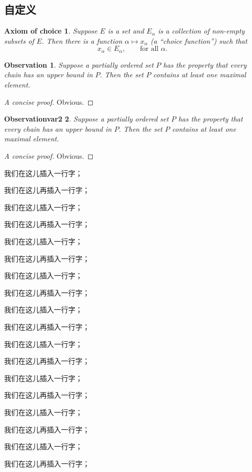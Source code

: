 \subsection{自定义}

\newtheorem*{axiomofchoice}{Axiom of choice}
\begin{axiomofchoice}
  Suppose $E$ is a set and ${E_\alpha}$ is a collection of
  non-empty subsets of $E$. Then there is a function $\alpha
    \mapsto x_\alpha$ (a ``choice function'') such that
  \begin{equation}
    x_\alpha \in E_\alpha,\qquad \text{for all }\alpha.
  \end{equation}
\end{axiomofchoice}

\newtheorem{observation}{Observation}[chapter]
\begin{observation}
  Suppose a partially ordered set $P$ has the property
  that every chain has an upper bound in $P$. Then the
  set $P$ contains at least one maximal element.
\end{observation}
\begin{proof}[A concise proof]
  Obvious.
\end{proof}

\newtheorem{observationvar2}[observation]{Observationvar2}
\begin{observationvar2}
  Suppose a partially ordered set $P$ has the property
  that every chain has an upper bound in $P$. Then the
  set $P$ contains at least one maximal element.
\end{observationvar2}
\begin{proof}[A concise proof]
  Obvious.
\end{proof}

我们在这儿插入一行字；

我们在这儿再插入一行字；

我们在这儿插入一行字；

我们在这儿再插入一行字；

我们在这儿插入一行字；

我们在这儿再插入一行字；

我们在这儿插入一行字；

我们在这儿再插入一行字；

我们在这儿插入一行字；

我们在这儿再插入一行字；

我们在这儿插入一行字；

我们在这儿再插入一行字；

我们在这儿插入一行字；

我们在这儿再插入一行字；

我们在这儿插入一行字；

我们在这儿再插入一行字；

我们在这儿插入一行字；

我们在这儿再插入一行字；
